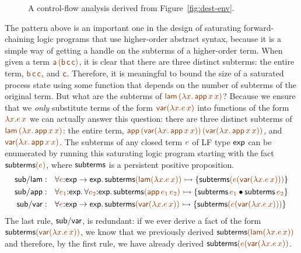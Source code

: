 \begin{figure}[t]
\caption{A control-flow analysis derived from Figure~\ref{fig:dest-env}.}
\label{fig:dest-cfa-1}
\end{figure}

The pattern above is an important one in the design of saturating
forward-chaining logic programs that use higher-order abstract syntax,
because it is a simple way of getting a handle on the subterms of a
higher-order term. When given a term $\lf{{\sf a}\,({\sf b}\,{\sf c}\,{\sf
  c})}$, it is clear that there are three distinct subterms: the entire
term, $\lf{{\sf b}\,{\sf c}\,{\sf c}}$, and $\lf{{\sf c}}$. Therefore, it is
meaningful to bound the size of a saturated process state using some
function that depends on the number of subterms of the original
term. But what are the subterms of $\lf{{\sf lam}\,(\lambda x.\,{\sf
  app}\,x\,x)}$?  Because we ensure that we {\it only} substitute terms
of the form $\lf{{\sf var}(\lambda x.e\,x)}$ into functions of the form
$\lf{\lambda x.e\,x}$ we can actually answer this question: there are three
distinct subterms of $\lf{{\sf lam}\,(\lambda x.\,{\sf app}\,x\,x)}$: the
entire term, $\lf{{\sf app}\,({\sf var}(\lambda x.\,{\sf
  app}\,x\,x))\,({\sf var}(\lambda x.\,{\sf app}\,x\,x))}$, and $\lf{{\sf
  var}(\lambda x.\,{\sf app}\,x\,x)}$.  The subterms of any closed term
$\lf{e}$ of LF type ${\sf exp}$ can be enumerated by running this
saturating logic program starting with the fact ${\sf subterms}\lf{(e)}$,
where ${\sf subterms}$ is a persistent positive proposition.
\begin{align*}
{\sf sub/lam} &: ~~
  \forall \lf{e}{:}{\sf exp} \rightarrow {\sf exp}.\,
    {\sf subterms}\lf{({\sf lam}(\lambda x.e\,x))} \lefti
      \{ {\sf subterms}\lf{(e({\sf var}(\lambda x.e\,x)))} \}
\\
{\sf sub/app} &: ~~
  \forall \lf{e_1}{:}{\sf exp}.\, \forall \lf{e_2}{:}{\sf exp}.\,
    {\sf subterms}\lf{({\sf app}\,e_1\,e_2)} \lefti
      \{ {\sf subterms}\,\lf{e_1} \fuse {\sf subterms}\,\lf{e_2} \}
\\
{\sf sub/var} &: ~~ 
  \forall \lf{e}{:}{\sf exp} \rightarrow {\sf exp}.\,
    {\sf subterms}\lf{({\sf var}(\lambda x.e\,x))} \lefti
      \{ {\sf subterms}\lf{(e({\sf var}(\lambda x.e\,x)))} \}
\end{align*}
The last rule, ${\sf sub/var}$, is redundant: if we ever derive a fact
of the form ${\sf subterms}\lf{({\sf var}(\lambda x.e\,x))}$, we know that
we previously derived ${\sf subterms}\lf{({\sf lam}(\lambda x.e\,x))}$ and
therefore, by the first rule, we have already derived ${\sf
  subterms}\lf{(e({\sf var}(\lambda x.e\,x))}$.



